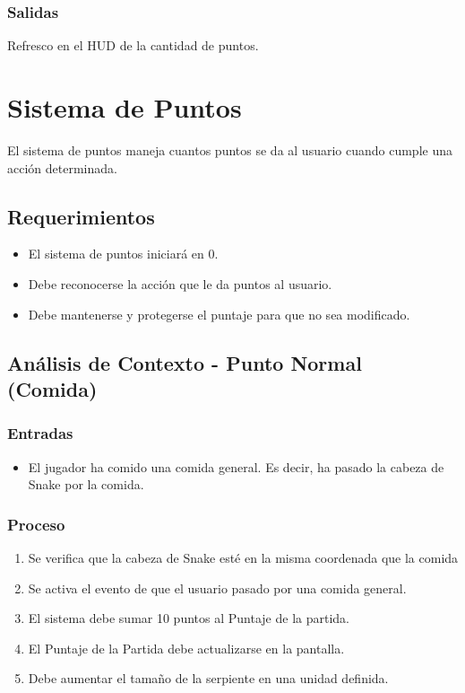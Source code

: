 \documentclass[letterpaper]{scrreprt}
\begin{document}
\subsubsection{Salidas}
Refresco en el HUD de la cantidad de puntos.



\section{Sistema de Puntos}
El sistema de puntos maneja cuantos puntos se da al usuario cuando cumple una acción determinada.

\subsection{Requerimientos}
\begin{itemize}
	\item El sistema de puntos iniciará en 0.
	\item Debe reconocerse la acción que le da puntos al usuario.
	\item Debe mantenerse y protegerse el puntaje para que no sea modificado.
\end{itemize}

\subsection{Análisis de Contexto - Punto Normal (Comida)}
\subsubsection{Entradas}
\begin{itemize}
	\item El jugador ha comido una comida general. Es decir, ha pasado la cabeza de Snake por la comida.
\end{itemize}
\subsubsection{Proceso}
\begin{enumerate}
	\item Se verifica que la cabeza de Snake esté en la misma coordenada que la comida
	\item Se activa el evento de que el usuario pasado por una comida general.
	\item El sistema debe sumar 10 puntos al Puntaje de la partida.
	\item El Puntaje de la Partida debe actualizarse en la pantalla.
	\item Debe aumentar el tamaño de la serpiente en una unidad definida.
\end{enumerate}
\end{document}
